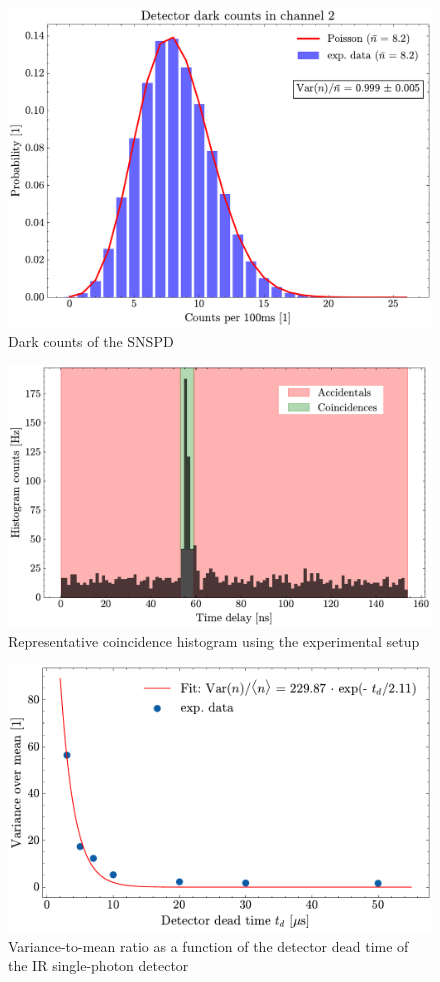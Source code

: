 \begin{figure}[h!]
\begin{minipage}{0.33\textwidth}
		\includegraphics[page=3,width=\linewidth]{Images/DC_chAll.pdf}
	\end{minipage}
	\caption{Dark counts of the SNSPD}
	\label{fig:DC}
\end{figure}

\begin{figure}[tb!]
	\centering
	\includegraphics[width=.7\textwidth]{Images/HistogramExample.pdf}
	\caption{Representative coincidence histogram using the experimental setup}
	\label{fig:HistExamAcc}
\end{figure}

\begin{figure}[tb!]
	\centering
	\includegraphics[width=.7\textwidth]{Images/VarMean_DeadTime_Afterpulsing.pdf}
	\caption{Variance-to-mean ratio as a function of the detector dead time of the IR single-photon detector}
	\label{fig:VoMDead}
\end{figure}